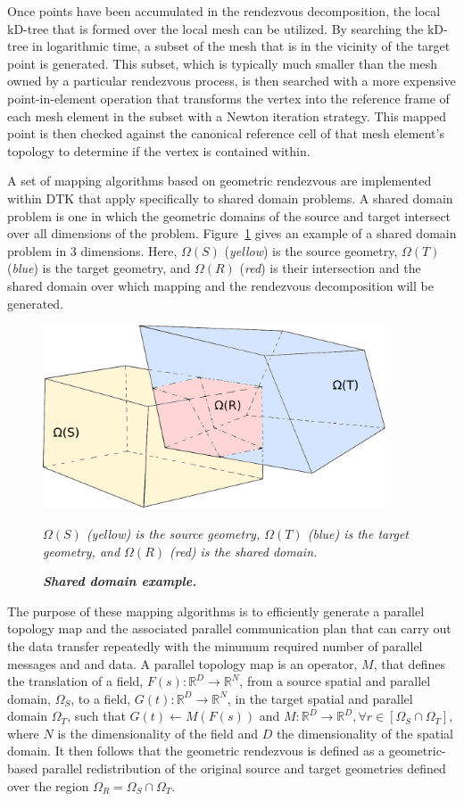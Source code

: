 \documentclass{mc2013}
\begin{document}
Once points have been accumulated in the rendezvous decomposition, the
local kD-tree that is formed over the local mesh can be utilized. By
searching the kD-tree in logarithmic time, a subset of the mesh that
is in the vicinity of the target point is generated. This subset,
which is typically much smaller than the mesh owned by a particular
rendezvous process, is then searched with a more expensive
point-in-element operation that transforms the vertex into the
reference frame of each mesh element in the subset with a Newton
iteration strategy. This mapped point is then checked against the
canonical reference cell of that mesh element's topology to determine
if the vertex is contained within.


A set of mapping algorithms based on geometric rendezvous are
implemented within DTK that apply specifically to shared domain
problems. A shared domain problem is one in which the geometric
domains of the source and target intersect over all dimensions of the
problem. Figure~\ref{fig:shared_domain} gives an example of a shared
domain problem in 3 dimensions. Here, $\Omega(S)$ ({\sl yellow}) is
the source geometry, $\Omega(T)$ ({\sl blue}) is the target geometry,
and $\Omega(R)$ ({\sl red}) is their intersection and the shared
domain over which mapping and the rendezvous decomposition will be
generated.
\begin{figure}[htpb!]
  \centering \includegraphics[width=4in]{overlapping_domain.pdf}
  \caption{\bf \sl Shared domain example.} {\sl $\Omega(S)$ (yellow)
    is the source geometry, $\Omega(T)$ (blue) is the target geometry,
    and $\Omega(R)$ (red) is the shared domain.}
  \label{fig:shared_domain}
\end{figure}
The purpose of these mapping algorithms is to efficiently generate a
parallel topology map and the associated parallel communication plan
that can carry out the data transfer repeatedly with the minumum
required number of parallel messages and and data. A parallel topology
map is an operator, $M$, that defines the translation of a field,
$F(s): \mathbb{R}^D \rightarrow \mathbb{R}^N$, from a source spatial
and parallel domain, $\Omega_S$, to a field, $G(t): \mathbb{R}^D
\rightarrow \mathbb{R}^N$, in the target spatial and parallel domain
$\Omega_T$, such that $G(t)\leftarrow M(F(s))$ and $M: \mathbb{R}^D
\rightarrow \mathbb{R}^D, \forall r \in [\Omega_S \cap \Omega_T]$,
where $N$ is the dimensionality of the field and $D$ the
dimensionality of the spatial domain. It then follows that the
geometric rendezvous is defined as a geometric-based parallel
redistribution of the original source and target geometries defined
over the region $\Omega_R = \Omega_S \cap \Omega_T$.
\end{document}
